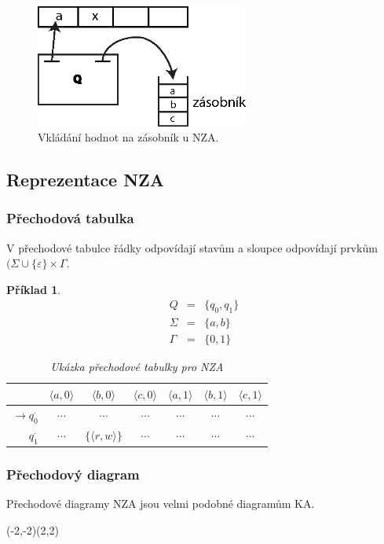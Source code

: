 \documentclass[10pt, a4paper, titlepage]{article}
\theoremstyle{note}
\newtheorem{priklad}{Příklad}
\begin{document}
\begin{figure}[ht]
\centering\includegraphics[width=7cm]{zasobnikovy-2.eps}
\caption{Vkládání hodnot na zásobník u NZA.}
\end{figure}

\subsection{Reprezentace NZA}

\subsubsection{Přechodová tabulka}
V přechodové tabulce řádky odpovídají stavům a sloupce odpovídají prvkům $(\Sigma \cup \lbrace \varepsilon \rbrace \times \Gamma$.
\begin{priklad}
\begin{eqnarray*}
Q &=& \lbrace q_0, q_1 \rbrace \\
\Sigma &=& \lbrace a, b \rbrace \\
\Gamma &=& \lbrace 0, 1 \rbrace
\end{eqnarray*}
\begin{table}[h]
\begin{center}
\begin{tabular}{ r || c | c | c | c | c | c}                   
 & $\langle a, 0 \rangle$ & $\langle b, 0 \rangle$ & $\langle c, 0 \rangle$ & $\langle a, 1 \rangle$ & $\langle b, 1 \rangle$ & $\langle c, 1 \rangle$ \\
\hline
$\rightarrow q_0^{\cdot}$ & $\cdots$ & $\cdots$ & $\cdots$ & $\cdots$ & $\cdots$ & $\cdots$ \\
$q_1^{\cdot}$ & $\cdots$ & $\lbrace \langle r, w \rangle \rbrace$ & $\cdots$ & $\cdots$ & $\cdots$ & $\cdots$
\end{tabular}
\end{center}
\caption{Ukázka přechodové tabulky pro NZA}
\end{table}
\end{priklad}

\subsubsection{Přechodový diagram}
Přechodov\'e diagramy NZA jsou velmi podobn\'e diagramům KA.
\begin{center}
\begin{VCPicture}{(-2,-2)(2,2)}
\end{VCPicture}
\end{center}
\end{document}
